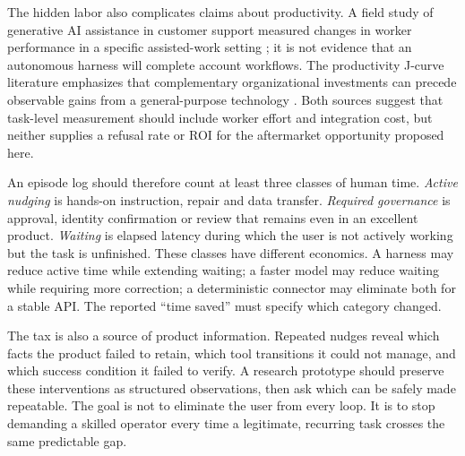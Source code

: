 The hidden labor also complicates claims about productivity. A field study of generative AI assistance in customer support measured changes in worker performance in a specific assisted-work setting \citep{genaiwork}; it is not evidence that an autonomous harness will complete account workflows. The productivity J-curve literature emphasizes that complementary organizational investments can precede observable gains from a general-purpose technology \citep{jcurve}. Both sources suggest that task-level measurement should include worker effort and integration cost, but neither supplies a refusal rate or ROI for the aftermarket opportunity proposed here.

An episode log should therefore count at least three classes of human time. \emph{Active nudging} is hands-on instruction, repair and data transfer. \emph{Required governance} is approval, identity confirmation or review that remains even in an excellent product. \emph{Waiting} is elapsed latency during which the user is not actively working but the task is unfinished. These classes have different economics. A harness may reduce active time while extending waiting; a faster model may reduce waiting while requiring more correction; a deterministic connector may eliminate both for a stable API. The reported ``time saved'' must specify which category changed.

The tax is also a source of product information. Repeated nudges reveal which facts the product failed to retain, which tool transitions it could not manage, and which success condition it failed to verify. A research prototype should preserve these interventions as structured observations, then ask which can be safely made repeatable. The goal is not to eliminate the user from every loop. It is to stop demanding a skilled operator every time a legitimate, recurring task crosses the same predictable gap.
